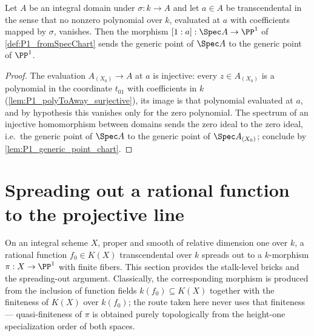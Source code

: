 \begin{theorem}
  \label{thm:P1_fromSpecChart_generic}
  \leanok
  Let \(A\) be an integral domain under \(\sigma : k \to A\) and let \(a \in A\) be
  transcendental in the sense that no nonzero polynomial over \(k\), evaluated at \(a\)
  with coefficients mapped by \(\sigma\), vanishes. Then the morphism
  \([1 : a] : \Spec A \to \PP^1\) of \ref{def:P1_fromSpecChart} sends the generic point of
  \(\Spec A\) to the generic point of \(\PP^1\).
\end{theorem}
\begin{proof}
  \leanok
  The evaluation \(A_{(X_0)} \to A\) at \(a\) is injective: every \(z \in A_{(X_0)}\) is a
  polynomial in the coordinate \(t_{01}\) with coefficients in \(k\)
  (\ref{lem:P1_polyToAway_surjective}), its image is that polynomial evaluated at \(a\),
  and by hypothesis this vanishes only for the zero polynomial. The spectrum of an
  injective homomorphism between domains sends the zero ideal to the zero ideal, i.e.\ the
  generic point of \(\Spec A\) to the generic point of \(\Spec A_{(X_0)}\); conclude by
  \ref{lem:P1_generic_point_chart}.
\end{proof}

\section{Spreading out a rational function to the projective line}

On an integral scheme \(X\), proper and smooth of relative dimension one over \(k\), a
rational function \(f_0 \in K(X)\) transcendental over \(k\) spreads out to a
\(k\)-morphism \(\pi : X \to \PP^1\) with finite fibers. This section provides the
stalk-level bricks and the spreading-out argument. Classically, the corresponding morphism
is produced from the inclusion of function fields \(k(f_0) \subseteq K(X)\) together with
the finiteness of \(K(X)\) over \(k(f_0)\); the route taken here never uses that
finiteness --- quasi-finiteness of \(\pi\) is obtained purely topologically from the
height-one specialization order of both spaces.

